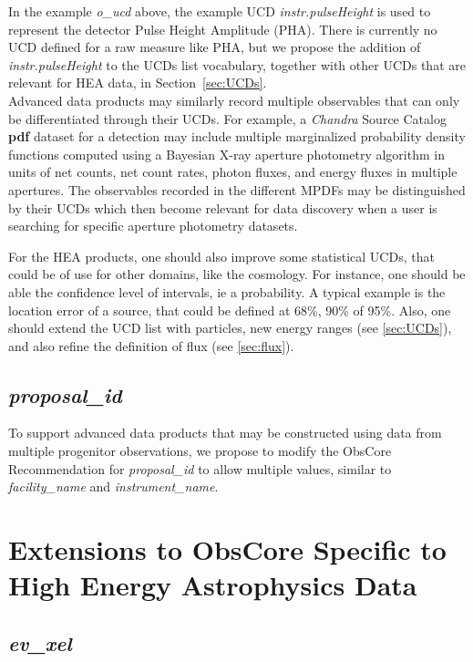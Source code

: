 \documentclass[11pt,a4paper]{ivoa}
\begin{document}
In the example {\em o\_ucd\/} above, the example UCD {\em instr.pulseHeight\/} is used to represent the detector Pulse Height Amplitude (PHA). There is currently no UCD defined for a raw measure like PHA, but we propose the addition of {\em instr.pulseHeight\/} to the UCDs list vocabulary, together with other UCDs that are relevant for \gls{HEA} data, in Section~\ref{sec:UCDs}.\\

Advanced data products may similarly record multiple observables that can only be differentiated through their UCDs. For example, a {\em Chandra\/} Source Catalog {\bf pdf} dataset for a detection may include multiple marginalized probability density functions computed using a Bayesian X-ray aperture photometry algorithm in units of net counts, net count rates, photon fluxes, and energy fluxes in multiple apertures.  The observables recorded in the different MPDFs may be distinguished by their UCDs which then become relevant for data discovery when a user is searching for specific aperture photometry datasets.

For the \gls{HEA} products, one should also improve some statistical UCDs, that could be of use for other domains, like the cosmology. For instance, one should be able the confidence level of intervals, ie a probability. A typical example is the location error of a source, that could be defined at 68\%, 90\% of 95\%. Also, one should extend the UCD list with particles, new energy ranges (see \ref{sec:UCDs}), and also refine the definition of flux (see \ref{sec:flux}).


\subsection{{\em proposal\_id}}

To support advanced data products that may be constructed using data from multiple progenitor observations, we propose to modify the ObsCore Recommendation for {\em proposal\_id\/} to allow multiple values, similar to {\em facility\_name\/} and {\em instrument\_name}.


\section{Extensions to ObsCore Specific to High Energy Astrophysics Data}
\label{sec:obscoreext}

\subsection{{\em ev\_xel}}
\end{document}
